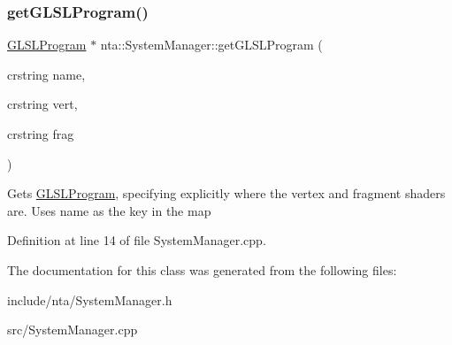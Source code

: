 \subsubsection{\texorpdfstring{get\+G\+L\+S\+L\+Program()}{getGLSLProgram()}\hspace{0.1cm}{\footnotesize\ttfamily [2/2]}}
{\footnotesize\ttfamily \hyperlink{classnta_1_1GLSLProgram}{G\+L\+S\+L\+Program} $\ast$ nta\+::\+System\+Manager\+::get\+G\+L\+S\+L\+Program (\begin{DoxyParamCaption}\item[{crstring}]{name,  }\item[{crstring}]{vert,  }\item[{crstring}]{frag }\end{DoxyParamCaption})\hspace{0.3cm}{\ttfamily [static]}}

Gets \hyperlink{classnta_1_1GLSLProgram}{G\+L\+S\+L\+Program}, specifying explicitly where the vertex and fragment shaders are. Uses name as the key in the map 

Definition at line 14 of file System\+Manager.\+cpp.



The documentation for this class was generated from the following files\+:\begin{DoxyCompactItemize}
\item 
include/nta/System\+Manager.\+h\item 
src/System\+Manager.\+cpp\end{DoxyCompactItemize}

